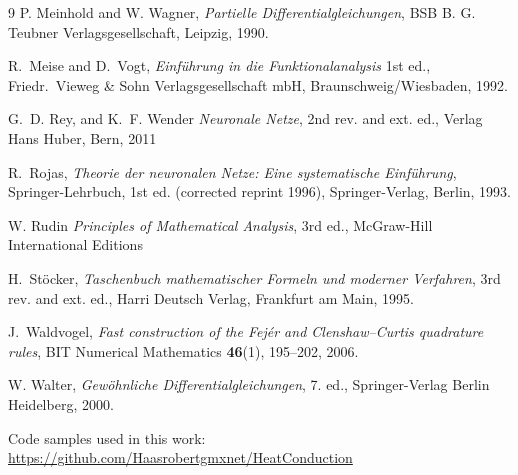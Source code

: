 \documentclass[a4paper,11pt]{article}
\theoremstyle{plain} %
\theoremstyle{definition} %
\theoremstyle{remark} %
\theoremstyle{remark}
\begin{document}
\begin{thebibliography}{9}
P. Meinhold and W. Wagner, 
\emph{Partielle Differentialgleichungen}, 
BSB B. G. Teubner Verlagsgesellschaft, Leipzig, 1990.

R.~Meise and D.~Vogt,
\emph{Einführung in die Funktionalanalysis}
1st ed., Friedr.~Vieweg \& Sohn Verlagsgesellschaft mbH,
Braunschweig/Wiesbaden, 1992.

G.~D. Rey, and K.~F. Wender
\emph{Neuronale Netze}, 
2nd rev. and ext. ed., Verlag Hans Huber, Bern, 2011

R.~Rojas,
\emph{Theorie der neuronalen Netze: Eine systematische Einführung},
Springer-Lehrbuch, 1st ed. (corrected reprint 1996), Springer-Verlag, Berlin, 1993.

W. Rudin
\emph{Principles of Mathematical Analysis},
3rd ed., McGraw-Hill International Editions

H.~Stöcker, 
\emph{Taschenbuch mathematischer Formeln und moderner Verfahren}, 
3rd rev. and ext. ed., Harri Deutsch Verlag, Frankfurt am Main, 1995.

J.~Waldvogel,
\emph{Fast construction of the Fej\'er and Clenshaw--Curtis quadrature rules},
BIT Numerical Mathematics \textbf{46}(1), 195--202, 2006.

W. Walter, 
\emph{Gewöhnliche Differentialgleichungen}, 
7. ed., Springer-Verlag Berlin Heidelberg, 2000.

Code samples used in this work: \url{https://github.com/Haasrobertgmxnet/HeatConduction}

\end{thebibliography}


\newpage

\end{document}
